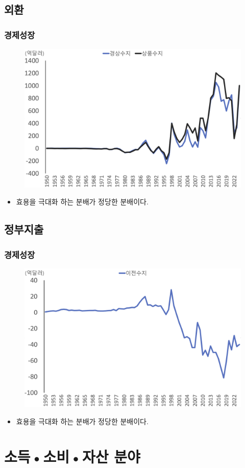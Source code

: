 \documentclass[aspectratio=169,xcolor=dvipsnames,handout]{beamer}
\begin{document}
\subsection{외환}
\begin{frame}[<+->]
\frametitle{경제성장}
    \begin{figure}
        \centering
        \includegraphics[width=.55\textwidth]{pic/fig_econ_06.png}
    \end{figure}
    \begin{itemize}
        \item 효용을 극대화 하는 분배가 정당한 분배이다.
    \end{itemize}
\end{frame}

\subsection{정부지출}
\begin{frame}[<+->]
\frametitle{경제성장}
    \begin{figure}
        \centering
        \includegraphics[width=.55\textwidth]{pic/fig_econ_07.png}
    \end{figure}
    \begin{itemize}
        \item 효용을 극대화 하는 분배가 정당한 분배이다.
    \end{itemize}
\end{frame}

\section{소득•소비•자산 분야}%
\end{document}
